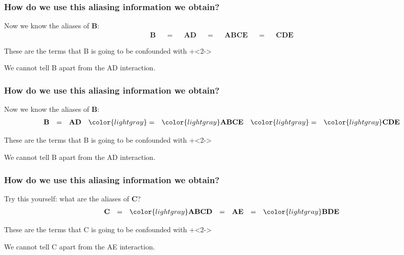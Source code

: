 \documentclass[handout,11pt,aspectratio=169,mathserif]{beamer}
\begin{document}
\begin{frame}\frametitle{How do we use this aliasing information we obtain?}
	Now we know the aliases of \textbf{B}:
	\begin{align*}
		\textbf{B} &&=&& \textbf{AD} &&=&& \textbf{ABCE} &&=&& \textbf{CDE}
	\end{align*}
	
	\vspace{1cm}
	\begin{itemize}
		\item	These are the terms that B is going to be confounded with
		\onslide+<2->{\item	We cannot tell B apart from the AD interaction.}
	\end{itemize}
\end{frame}

\begin{frame}\frametitle{How do we use this aliasing information we obtain?}
	Now we know the aliases of \textbf{B}:
	\begin{align*}
		\textbf{B} &&=&& \textbf{AD} &&\color{lightgray}=&& {\color{lightgray}\textbf{ABCE}} &&\color{lightgray}=&& \color{lightgray} \textbf{CDE}
	\end{align*}
	
	\vspace{1cm}
	\begin{itemize}
		\item	These are the terms that B is going to be confounded with
		\onslide+<2->{\item	We cannot tell B apart from the AD interaction.}
	\end{itemize}
\end{frame}

\begin{frame}\frametitle{How do we use this aliasing information we obtain?}
	Try this yourself: what are the aliases of \textbf{C}?
	\pause
	\begin{align*}
		\textbf{C} &&=&& \color{lightgray}\textbf{ABCD} &&=&& \textbf{AE} &&=&&\color{lightgray} \textbf{BDE}
	\end{align*}
	
	
	\vspace{1cm}
	\begin{itemize}
		\item	These are the terms that C is going to be confounded with
		\onslide+<2->{\item	We cannot tell C apart from the AE interaction.}
	\end{itemize}
\end{frame}
\end{document}
